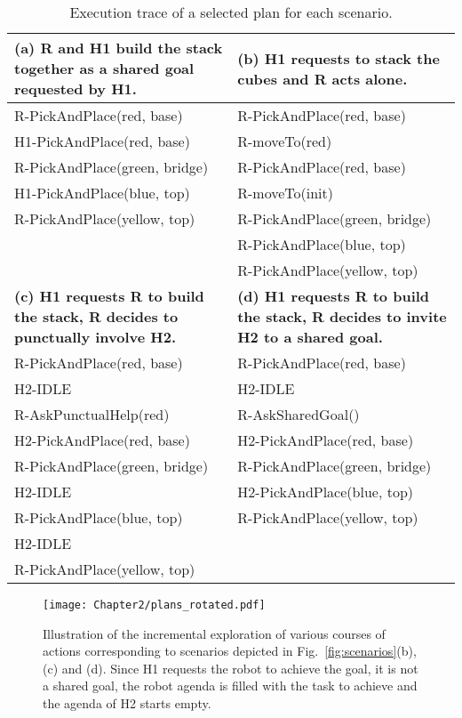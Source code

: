 \begin{table}
\small
\begin{tabularx}{0.98\textwidth}{|X||X|}
    \hline
    \textbf{(a) R and H1 build the stack together as a shared goal requested by H1.}     & \textbf{(b) H1 requests to stack the cubes and R acts alone.} \\
    \hline
    R-PickAndPlace(red, base)     & R-PickAndPlace(red, base) \\ 
    H1-PickAndPlace(red, base)     & R-moveTo(red) \\  
    R-PickAndPlace(green, bridge) & R-PickAndPlace(red, base) \\
    H1-PickAndPlace(blue, top)     & R-moveTo(init) \\
    R-PickAndPlace(yellow, top)   & R-PickAndPlace(green, bridge) \\
                                    & R-PickAndPlace(blue, top) \\
                                    & R-PickAndPlace(yellow, top) \\
    \hline \hline
    \textbf{(c) H1 requests R to build the stack, R decides to punctually involve H2.} & \textbf{(d) H1 requests R to build the stack, R decides to invite H2 to a shared goal.} \\
    \hline
    R-PickAndPlace(red, base)     & R-PickAndPlace(red, base) \\
    H2-IDLE                        & H2-IDLE \\
    R-AskPunctualHelp(red)        & R-AskSharedGoal() \\
    H2-PickAndPlace(red, base)     & H2-PickAndPlace(red, base) \\
    R-PickAndPlace(green, bridge) & R-PickAndPlace(green, bridge) \\
    H2-IDLE                        & H2-PickAndPlace(blue, top) \\
    R-PickAndPlace(blue, top)     & R-PickAndPlace(yellow, top) \\
    H2-IDLE                        & \\
    R-PickAndPlace(yellow, top)   & \\
    \hline
\end{tabularx}
\caption{Execution trace of a selected plan for each scenario.}
\label{tab:plans}
\end{table}

\begin{figure}
    \centering 
    \texttt{[image: Chapter2/plans\_rotated.pdf]}
    \caption{Illustration of the incremental exploration of various courses of actions corresponding to scenarios depicted in Fig.~\ref{fig:scenarios}(b), (c) and (d). Since H1 requests the robot to achieve the goal, it is not a shared goal, the robot agenda is filled with the task to achieve and the agenda of H2 starts empty.}
    \label{fig:plans}
\end{figure}

